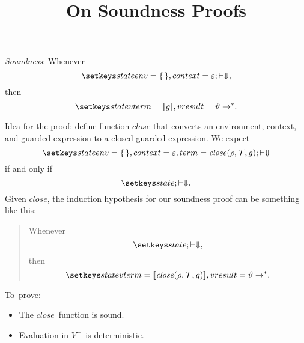 \documentclass{article}
\title{On Soundness Proofs}
\providecommand\Vminus{\ensuremath{V^-}}
\begin{document}
\maketitle


\noindent
\emph{Soundness}: Whenever
$$\vmrun[env=\emptyenv,context=\emptycontext]\text,$$
then
$$\vrun[vterm=\translation{g},vresult=\vartheta]\text.$$



\newcommand\closefun{\ensuremath{\mathit{close}}}
\newcommand\close[3]{\closefun(#1,#2,#3)}

Idea for the proof: define function $\closefun$ that converts an
environment, context, and guarded expression to a closed guarded
expression.
We expect
$$\vmrun[env=\emptyenv,context=\emptycontext,term=\close\rho\context g]$$
if and only if
$$\vmrun[]\text.$$
Given \closefun, 
the induction hypothesis for our soundness proof can be something like
this:
\begin{quote}
Whenever 
$$\vmrun[]\text,$$
then
$$\vrun[vterm=\translation{\close\rho\context g},vresult=\vartheta]\text.$$
\end{quote}

To~prove:
\begin{itemize}
\item
The \closefun\ function is sound.
\item
Evaluation in \Vminus\ is deterministic.
\end{itemize}
\end{document}
